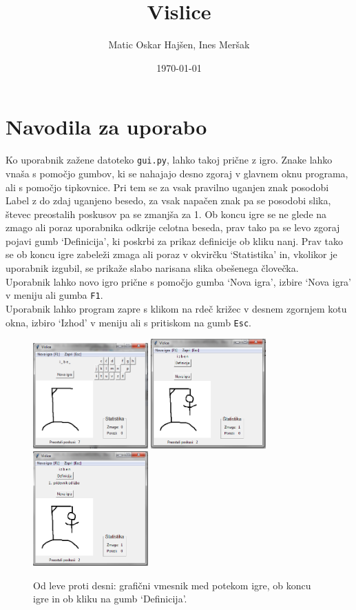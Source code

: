 \documentclass [a4paper, 12pt] {article}
\title {Vislice}
\author {Matic Oskar Hajšen, Ines Meršak}
\date {\today}
\begin{document}
\maketitle
\tableofcontents

\newpage

\section {Navodila za uporabo}
Ko uporabnik zažene datoteko \texttt {gui.py}, lahko takoj prične z igro. Znake lahko vnaša s pomočjo gumbov, ki se nahajajo desno zgoraj v glavnem oknu programa, ali s pomočjo tipkovnice. Pri tem se za vsak pravilno uganjen znak posodobi Label z do zdaj uganjeno besedo, za vsak napačen znak pa se posodobi slika, števec preostalih poskusov pa se zmanjša za 1. Ob koncu igre se ne glede na zmago ali poraz uporabnika odkrije celotna beseda, prav tako pa se levo zgoraj pojavi gumb `Definicija', ki poskrbi za prikaz definicije ob kliku nanj. Prav tako se ob koncu igre zabeleži zmaga ali poraz v okvirčku `Statistika' in, vkolikor je uporabnik izgubil, se prikaže slabo narisana slika obešenega človečka. \\
Uporabnik lahko novo igro prične s pomočjo gumba `Nova igra', izbire `Nova igra' v meniju ali gumba \texttt {F1}. \\
Uporabnik lahko program zapre s klikom na rdeč križec v desnem zgornjem kotu okna, izbiro `Izhod' v meniju ali s pritiskom na gumb \texttt {Esc}.
\begin {figure} [h]
\centering
\includegraphics [width=125pt] {slike/za_porocilo_gui_progress.png}
\includegraphics [width=125pt] {slike/za_porocilo_gui_zmaga.png}
\includegraphics [width=125pt] {slike/za_porocilo_gui_definicija.png}
\caption {Od leve proti desni: grafični vmesnik med potekom igre, ob koncu igre in ob kliku na gumb `Definicija'.}
\end {figure}
\end{document}
